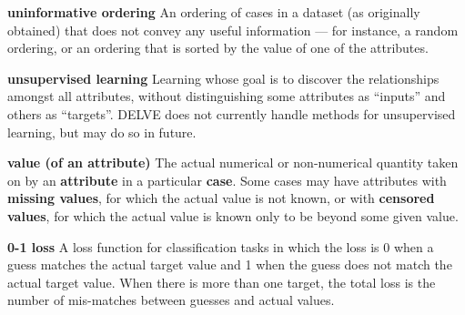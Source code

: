 \begin{list}{}{%
\setlength{\itemsep}{0in}%
\setlength{\leftmargin}{2.25in}%
\setlength{\labelsep}{0in}%
\setlength{\labelwidth}{2.25in}}
\item[\bf uninformative ordering \hfill]
An ordering of cases in a dataset (as originally obtained) 
that does not convey any useful information --- for instance, 
a random ordering, or an ordering that is sorted by the value
of one of the attributes.

\item[\bf unsupervised learning \hfill]
Learning whose goal is to discover the relationships amongst
all attributes, without distinguishing some attributes as ``inputs''
and others as ``targets''.  DELVE does not currently
handle methods for unsupervised learning, but may do so in future.

\item[\bf value (of an attribute) \hfill]
The actual numerical or non-numerical quantity taken on by 
an {\bf attribute} in a particular {\bf case}.  Some cases may
have attributes with {\bf missing values}, for which the actual value is
not known, or with {\bf censored values}, for which the actual value is
known only to be beyond some given value.

\item[\bf 0-1 loss \hfill]
A loss function for classification tasks in which the loss is 0
when a guess matches the actual target value and 1 when the guess 
does not match the actual target value.  When there is more than one 
target, the total loss is the number of mis-matches between guesses 
and actual values.

\end{list}
